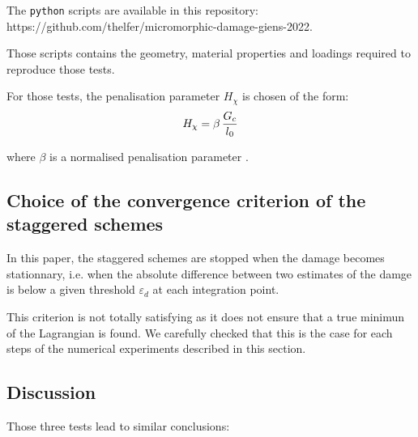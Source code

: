 The \texttt{python} scripts are available in this repository:
https://github.com/thelfer/micromorphic-damage-giens-2022.

Those scripts contains the geometry, material properties and loadings
required to reproduce those tests.

For those tests, the penalisation parameter \(H_{\chi}\) is chosen of
the form:
\[
H_{\chi}= \beta\,\displaystyle \frac{\displaystyle G_{c}}{\displaystyle l_{0}}
\]

where \(\beta\) is a normalised penalisation parameter \cite{bharali_computational_2021}.

\subsection{Choice of the convergence criterion of the staggered schemes}

In this paper, the staggered schemes are stopped when the damage becomes
stationnary, i.e. when the absolute difference between two estimates of
the damge is below a given threshold \(\varepsilon_{d}\) at each
integration point.

This criterion is not totally satisfying as it does not ensure that a
true minimun of the Lagrangian is found. We carefully checked that this
is the case for each steps of the numerical experiments described in
this section.

\subsection{Discussion}

Those three tests lead to similar conclusions:


